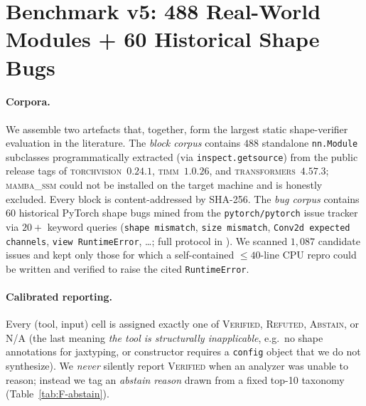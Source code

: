 \section{Benchmark v5: 488 Real-World Modules + 60 Historical Shape Bugs}
\label{sec:F_benchmark}

\paragraph{Corpora.}
We assemble two artefacts that, together, form the largest static
shape-verifier evaluation in the literature.  The \emph{block corpus}
contains $488$ standalone \texttt{nn.Module} subclasses programmatically
extracted (via \texttt{inspect.getsource}) from the public release tags of
\textsc{torchvision}~$0.24.1$, \textsc{timm}~$1.0.26$, and
\textsc{transformers}~$4.57.3$;  \textsc{mamba\_ssm} could not be installed
on the target machine and is honestly excluded.  Every block is
content-addressed by SHA-256.  The \emph{bug corpus} contains $60$
historical PyTorch shape bugs mined from the
\texttt{pytorch/pytorch} issue tracker via $20{+}$ keyword queries
(\texttt{shape mismatch}, \texttt{size mismatch}, \texttt{Conv2d expected channels},
\texttt{view RuntimeError}, \dots; full protocol in
).  We scanned $1{,}087$
candidate issues and kept only those for which a self-contained
$\le 40$-line CPU repro could be written and verified to raise the cited
\texttt{RuntimeError}.

\paragraph{Calibrated reporting.}
Every (tool, input) cell is assigned exactly one of
\textsc{Verified}, \textsc{Refuted}, \textsc{Abstain}, or
\textsc{N/A} (the last meaning \emph{the tool is structurally
inapplicable}, e.g.\ no shape annotations for jaxtyping, or constructor
requires a \texttt{config} object that we do not synthesize).  We
\emph{never} silently report \textsc{Verified} when an analyzer was
unable to reason; instead we tag an \emph{abstain reason} drawn from a
fixed top-10 taxonomy (Table~\ref{tab:F-abstain}).

